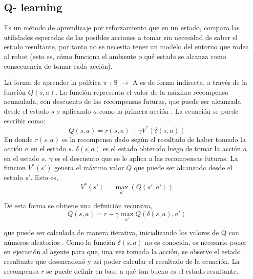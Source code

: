 \subsection{Q- learning}\label{subsec:Qlearning}

Es un método de aprendizaje por reforzamiento que en un estado, compara las utilidades esperadas de las posibles acciones a tomar sin necesidad de saber el estado resultante, por tanto no se necesita tener un modelo del entorno que rodea al robot \cite{peterNorvig} (esto es, cómo funciona el ambiente o qu\'e estado se alcanza como consecuencia de tomar cada acción).

La forma de aprender la política $\pi$ : S $\to$ A es de forma indirecta, a través de la función $Q(s,a)$. La función representa el valor de la máxima recompensa acumulada, con descuento de las recompensas futuras, que puede ser alcanzada desde el estado $s$ y aplicando $a$ como la primera acción \cite{Mitchell}. La ecuación se puede escribir como:
\[Q(s,a) = r(s,a) + \gamma V^*(\delta(s,a))\]
En donde $r(s,a)$ es la recompensa dado según el resultado de haber tomado la acción $a$ en el estado $s$. $\delta(s,a)$ es el estado obtenido luego de tomar la acción $a$ en el estado $s$. $\gamma$ es el descuento que se le aplica a las recompensas futuras. La funcion $V^*(s')$ genera el máximo valor $Q$ que puede ser alcanzado desde el estado $s'$. Esto es,
\[V^*(s')= \max_{a'} (Q(s',a'))\] 

De esta forma se obtiene una definición recursiva,
\[Q(s,a) = r + \gamma \max_{a'} Q(\delta(s,a),a')\]

\noindent
que puede ser calculada de manera iterativa, inicializando los valores de Q con números aleatorios \cite{Mitchell}. Como la función $\delta(s,a)$ no es conocida, es necesario poner en ejecución al agente para que, una vez tomada la acción, se observe el estado resultante que desencadenó y así poder calcular el resultado de la ecuación. La recompensa $r$ se puede definir en base  a qu\'e tan bueno es el estado resultante. 


